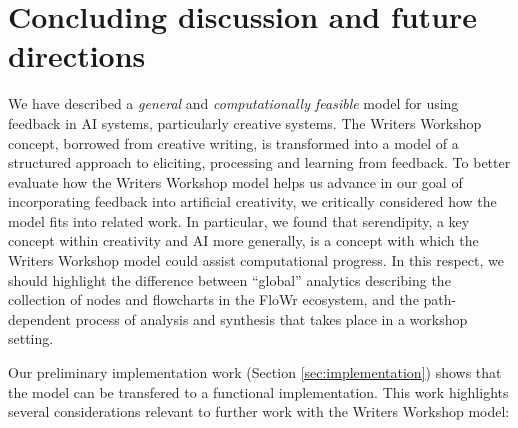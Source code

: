 \section{Concluding discussion and future directions}

 We have described a \emph{general} and \emph{computationally
   feasible} model for using feedback in AI systems, particularly
 creative systems.  The Writers Workshop concept, borrowed from
 creative writing, is transformed into a model of a structured
 approach to eliciting, processing and learning from feedback.  To
 better evaluate how the Writers Workshop model helps us advance in
 our goal of incorporating feedback into artificial creativity, we
 critically considered how the model fits into related work. In
 particular, we found that serendipity, a key concept within
 creativity and AI more generally, is a concept with which the Writers
 Workshop model could assist computational progress.
In this respect, we should highlight the difference between
``global'' analytics describing the collection of nodes and
flowcharts in the FloWr ecosystem, and the path-dependent
process of analysis and synthesis that takes place in a workshop setting.

Our preliminary implementation work (Section \ref{sec:implementation}) shows
that the model can be transfered to a functional implementation.  This
work highlights several considerations relevant to further work with
the Writers Workshop model:

